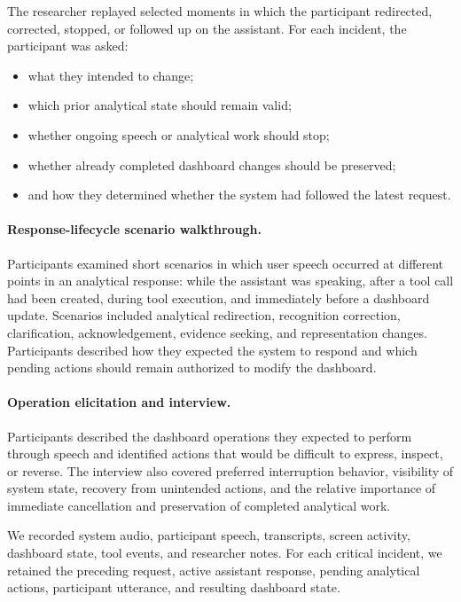 \documentclass[journal]{IEEEtran}
\begin{document}
The researcher replayed selected moments in which the participant redirected,
corrected, stopped, or followed up on the assistant. For each incident, the
participant was asked:

\begin{itemize}
\item what they intended to change;
\item which prior analytical state should remain valid;
\item whether ongoing speech or analytical work should stop;
\item whether already completed dashboard changes should be preserved;
\item and how they determined whether the system had followed the latest
request.
\end{itemize}

\paragraph{Response-lifecycle scenario walkthrough.}

Participants examined short scenarios in which user speech occurred at
different points in an analytical response: while the assistant was speaking,
after a tool call had been created, during tool execution, and immediately
before a dashboard update. Scenarios included analytical redirection,
recognition correction, clarification, acknowledgement, evidence seeking, and
representation changes. Participants described how they expected the system
to respond and which pending actions should remain authorized to modify the
dashboard.

\paragraph{Operation elicitation and interview.}

Participants described the dashboard operations they expected to perform
through speech and identified actions that would be difficult to express,
inspect, or reverse. The interview also covered preferred interruption
behavior, visibility of system state, recovery from unintended actions, and
the relative importance of immediate cancellation and preservation of
completed analytical work.

We recorded system audio, participant speech, transcripts, screen activity,
dashboard state, tool events, and researcher notes. For each critical incident,
we retained the preceding request, active assistant response, pending
analytical actions, participant utterance, and resulting dashboard state.
\end{document}

